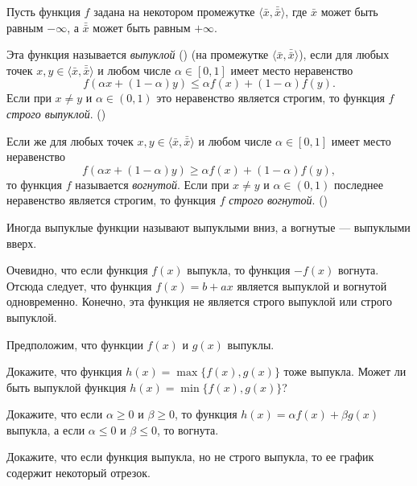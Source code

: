     Пусть функция $f$ задана на некотором промежутке
    $\langle \bar{x},\bar{\bar{x}} \rangle$, где $\bar{x}$ может быть равным $-\infty$, а
    $\bar{\bar{x}}$ может быть равным $+\infty$.


    Эта функция называется \emph{выпуклой} () (на промежутке
    $\langle \bar{x},\bar{\bar{x}} \rangle$), если для любых точек
    $x,y\in\langle \bar{x},\bar{\bar{x}} \rangle$ и любом числе
    $\alpha\in[0,1]$ имеет место неравенство
\begin{equation}
    \label{vipuk}
    f(\alpha x +(1-\alpha)y)\leqslant \alpha f(x)+(1-\alpha)f(y).
\end{equation}
    Если при $x\neq y$ и $\alpha\in(0,1)$ это неравенство является
    строгим, то функция $f$ \emph{строго выпуклой}.
    ()

    Если же для любых точек
    $x,y\in\langle \bar{x},\bar{\bar{x}} \rangle$ и любом числе
    $\alpha\in[0,1]$ имеет место неравенство
\begin{equation}
    \label{vipuk}
    f(\alpha x +(1-\alpha)y)\geqslant\alpha f(x)+(1-\alpha)f(y),
\end{equation}
    то функция $f$ называется \emph{вогнутой}. Если при $x\neq y$ и
    $\alpha\in(0,1)$ последнее неравенство является
    строгим, то функция $f$ \emph{строго вогнутой}.
    ()

    Иногда выпуклые функции называют выпуклыми вниз, а вогнутые ---
    выпуклыми вверх.

    Очевидно, что если функция $f(x)$ выпукла, то функция $-f(x)$
    вогнута. Отсюда следует, что функция $f(x)=b+ax$ является выпуклой
    и вогнутой одновременно. Конечно, эта функция не является строго выпуклой или строго
    выпуклой.
\begin{exer}
    Предположим, что функции $f(x)$ и $g(x)$ выпуклы.

    Докажите, что функция
    $h(x)=\max\{f(x),g(x)\}$ тоже выпукла. Может ли быть выпуклой
    функция $h(x)=\min\{f(x),g(x)\}$?

    Докажите, что если
    $\alpha\geqslant0$ и $\beta\geqslant0$, то функция $h(x)=\alpha f(x)+\beta g(x)$
    выпукла, а если $\alpha\leqslant0$ и $\beta\leqslant0$, то вогнута.
\end{exer}

\begin{exer}
    Докажите, что если функция выпукла, но не строго выпукла, то ее
    график содержит некоторый отрезок.
\end{exer}

